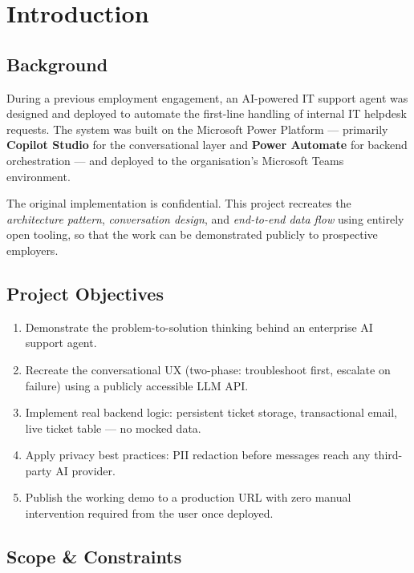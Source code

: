 \documentclass[12pt, a4paper]{article}
\begin{document}
\section{Introduction}

\subsection{Background}

During a previous employment engagement, an AI-powered IT support agent was designed and
deployed to automate the first-line handling of internal IT helpdesk requests. The system
was built on the Microsoft Power Platform --- primarily \textbf{Copilot Studio} for the
conversational layer and \textbf{Power Automate} for backend orchestration --- and deployed
to the organisation's Microsoft Teams environment.

The original implementation is confidential. This project recreates the \emph{architecture
pattern}, \emph{conversation design}, and \emph{end-to-end data flow} using entirely open
tooling, so that the work can be demonstrated publicly to prospective employers.

\subsection{Project Objectives}

\begin{enumerate}[leftmargin=*, label=\arabic*.]
  \item Demonstrate the problem-to-solution thinking behind an enterprise AI support agent.
  \item Recreate the conversational UX (two-phase: troubleshoot first, escalate on failure)
        using a publicly accessible LLM API.
  \item Implement real backend logic: persistent ticket storage, transactional email,
        live ticket table — no mocked data.
  \item Apply privacy best practices: PII redaction before messages reach any third-party AI
        provider.
  \item Publish the working demo to a production URL with zero manual intervention required
        from the user once deployed.
\end{enumerate}

\subsection{Scope \& Constraints}
\end{document}
